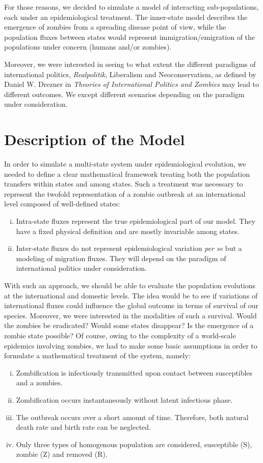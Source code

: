 \documentclass[11pt]{article} %
\begin{document}
For those reasons, we decided to simulate a model of interacting sub-populations, each under an epidemiological treatment. The inner-state model describes the emergence of zombies from a spreading disease point of view, while the population fluxes between states would represent immigration/emigration of the populations under concern (humans and/or zombies). 

Moreover, we were interested in seeing to what extent the different paradigms of international politics, \textit{Realpolitik}, Liberalism and Neoconservatism, as defined by Daniel W. Drezner in \textit{Theories of International Politics and Zombies} \cite{drezner} may lead to different outcomes. We except different scenarios depending on the paradigm under consideration. 

\newpage
\section{Description of the Model}\indent

In order to simulate a multi-state system under epidemiological evolution, we needed to define a clear mathematical framework treating both the population transfers within states and among states. Such a treatment was necessary to represent the twofold representation of a zombie outbreak at an international level composed of well-defined states:
\begin{enumerate}[i.]
	\item Intra-state fluxes represent the true epidemiological part of our model. They have a fixed physical definition and are mostly invariable among states.
	\item Inter-state fluxes do not represent epidemiological variation \textit{per se} but a modeling of migration fluxes. They will depend on the paradigm of international politics under consideration. 
\end{enumerate}

With such an approach, we should be able to evaluate the population evolutions at the international and domestic levels. The idea would be to see if variations of international fluxes could influence the global outcome in terms of survival of our species. Moreover, we were interested in the modalities of such a survival. Would the zombies be eradicated? Would some states disappear? Is the emergence of a zombie state possible? Of course, owing to the complexity of a world-scale epidemics involving zombies, we had to make some basic assumptions in order to formulate a mathematical treatment of the system, namely:
\begin{enumerate}[i.]
	\item Zombification is infectiously transmitted upon contact between susceptibles and a zombies.
	\item Zombification occurs instantaneously without latent infectious phase.
	\item The outbreak occurs over a short amount of time. Therefore, both natural death rate and birth rate can be neglected.
	\item Only three types of homogenous population are considered, susceptible (S), zombie (Z) and removed (R).
\end{enumerate}
\end{document}
